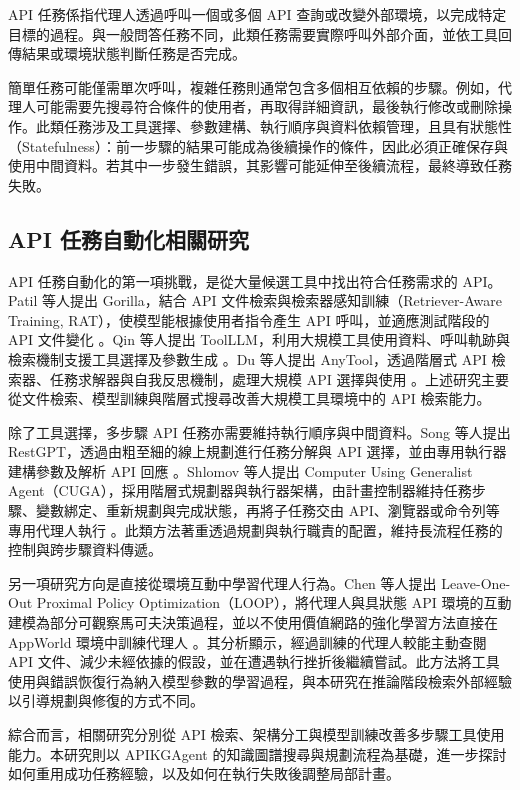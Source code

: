 API 任務係指代理人透過呼叫一個或多個 API 查詢或改變外部環境，以完成特定目標的過程。與一般問答任務不同，此類任務需要實際呼叫外部介面，並依工具回傳結果或環境狀態判斷任務是否完成。

簡單任務可能僅需單次呼叫，複雜任務則通常包含多個相互依賴的步驟。例如，代理人可能需要先搜尋符合條件的使用者，再取得詳細資訊，最後執行修改或刪除操作。此類任務涉及工具選擇、參數建構、執行順序與資料依賴管理，且具有狀態性（Statefulness）：前一步驟的結果可能成為後續操作的條件，因此必須正確保存與使用中間資料。若其中一步發生錯誤，其影響可能延伸至後續流程，最終導致任務失敗。

\subsection{API 任務自動化相關研究}

API 任務自動化的第一項挑戰，是從大量候選工具中找出符合任務需求的 API。Patil 等人提出 Gorilla，結合 API 文件檢索與檢索器感知訓練（Retriever-Aware Training, RAT），使模型能根據使用者指令產生 API 呼叫，並適應測試階段的 API 文件變化 \cite{patil2024gorilla}。Qin 等人提出 ToolLLM，利用大規模工具使用資料、呼叫軌跡與檢索機制支援工具選擇及參數生成 \cite{qin2023toolllm}。Du 等人提出 AnyTool，透過階層式 API 檢索器、任務求解器與自我反思機制，處理大規模 API 選擇與使用 \cite{du2024anytool}。上述研究主要從文件檢索、模型訓練與階層式搜尋改善大規模工具環境中的 API 檢索能力。

除了工具選擇，多步驟 API 任務亦需要維持執行順序與中間資料。Song 等人提出 RestGPT，透過由粗至細的線上規劃進行任務分解與 API 選擇，並由專用執行器建構參數及解析 API 回應 \cite{song2023restgpt}。Shlomov 等人提出 Computer Using Generalist Agent（CUGA），採用階層式規劃器與執行器架構，由計畫控制器維持任務步驟、變數綁定、重新規劃與完成狀態，再將子任務交由 API、瀏覽器或命令列等專用代理人執行 \cite{shlomov2026benchmarks}。此類方法著重透過規劃與執行職責的配置，維持長流程任務的控制與跨步驟資料傳遞。

另一項研究方向是直接從環境互動中學習代理人行為。Chen 等人提出 Leave-One-Out Proximal Policy Optimization（LOOP），將代理人與具狀態 API 環境的互動建模為部分可觀察馬可夫決策過程，並以不使用價值網路的強化學習方法直接在 AppWorld 環境中訓練代理人 \cite{chen2025loop}。其分析顯示，經過訓練的代理人較能主動查閱 API 文件、減少未經依據的假設，並在遭遇執行挫折後繼續嘗試。此方法將工具使用與錯誤恢復行為納入模型參數的學習過程，與本研究在推論階段檢索外部經驗以引導規劃與修復的方式不同。

綜合而言，相關研究分別從 API 檢索、架構分工與模型訓練改善多步驟工具使用能力。本研究則以 APIKGAgent 的知識圖譜搜尋與規劃流程為基礎，進一步探討如何重用成功任務經驗，以及如何在執行失敗後調整局部計畫。

